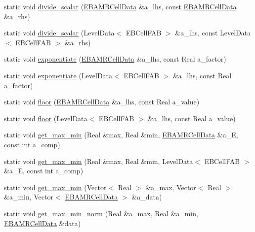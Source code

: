\begin{DoxyCompactItemize}
\item 
static void \hyperlink{classdata__ops_a1c3b0795b4ee4c75ee26fde026a6dcbd}{divide\+\_\+scalar} (\hyperlink{type__definitions_8H_a7e610f301989e5e07781c5e338bdb7c3}{E\+B\+A\+M\+R\+Cell\+Data} \&a\+\_\+lhs, const \hyperlink{type__definitions_8H_a7e610f301989e5e07781c5e338bdb7c3}{E\+B\+A\+M\+R\+Cell\+Data} \&a\+\_\+rhs)
\item 
static void \hyperlink{classdata__ops_afe8ee8d4f66b44611190c1975f0d0eea}{divide\+\_\+scalar} (Level\+Data$<$ E\+B\+Cell\+F\+AB $>$ \&a\+\_\+lhs, const Level\+Data$<$ E\+B\+Cell\+F\+AB $>$ \&a\+\_\+rhs)
\item 
static void \hyperlink{classdata__ops_aaec7ee10fd822d470eb2b958f62a8370}{exponentiate} (\hyperlink{type__definitions_8H_a7e610f301989e5e07781c5e338bdb7c3}{E\+B\+A\+M\+R\+Cell\+Data} \&a\+\_\+lhs, const Real a\+\_\+factor)
\item 
static void \hyperlink{classdata__ops_adc34abfe1868298ab13328e38128f3b3}{exponentiate} (Level\+Data$<$ E\+B\+Cell\+F\+AB $>$ \&a\+\_\+lhs, const Real a\+\_\+factor)
\item 
static void \hyperlink{classdata__ops_a43631f40bcb206695a89f8f6de150ab8}{floor} (\hyperlink{type__definitions_8H_a7e610f301989e5e07781c5e338bdb7c3}{E\+B\+A\+M\+R\+Cell\+Data} \&a\+\_\+lhs, const Real a\+\_\+value)
\item 
static void \hyperlink{classdata__ops_af648b088e70567622535a9fc509e965a}{floor} (Level\+Data$<$ E\+B\+Cell\+F\+AB $>$ \&a\+\_\+lhs, const Real a\+\_\+value)
\item 
static void \hyperlink{classdata__ops_aebb373e4439bf21510c497c2537fd9f4}{get\+\_\+max\+\_\+min} (Real \&max, Real \&min, \hyperlink{type__definitions_8H_a7e610f301989e5e07781c5e338bdb7c3}{E\+B\+A\+M\+R\+Cell\+Data} \&a\+\_\+E, const int a\+\_\+comp)
\item 
static void \hyperlink{classdata__ops_a5900ed72cb093f157b8e72c692342f5b}{get\+\_\+max\+\_\+min} (Real \&max, Real \&min, Level\+Data$<$ E\+B\+Cell\+F\+AB $>$ \&a\+\_\+E, const int a\+\_\+comp)
\item 
static void \hyperlink{classdata__ops_afb5f047f92cab1724563d57633bed449}{get\+\_\+max\+\_\+min} (Vector$<$ Real $>$ \&a\+\_\+max, Vector$<$ Real $>$ \&a\+\_\+min, Vector$<$ \hyperlink{type__definitions_8H_a7e610f301989e5e07781c5e338bdb7c3}{E\+B\+A\+M\+R\+Cell\+Data} $>$ \&a\+\_\+data)
\item 
static void \hyperlink{classdata__ops_aa8970fdef004d4dd0cd9adb2c4f3cb43}{get\+\_\+max\+\_\+min\+\_\+norm} (Real \&a\+\_\+max, Real \&a\+\_\+min, \hyperlink{type__definitions_8H_a7e610f301989e5e07781c5e338bdb7c3}{E\+B\+A\+M\+R\+Cell\+Data} \&data)

\end{DoxyCompactItemize}
